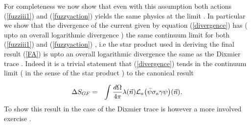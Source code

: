 \documentclass[a4paper,10pt]{article}
\begin{document}
For completeness we now show that even with this assumption both actions (\ref{fuzziii1}) and (\ref{fuzzyaction}) yields the same physics at the limit . In particular we show that the divergence of the current given by equation (\ref{divergence}) has ( upto an overall logarithmic divergence ) the same continuum limit for both (\ref{fuzziii1}) and (\ref{fuzzyaction}) , i.e the star product used in deriving the final result (\ref{FA}) is upto an overall logarithmic divergence the same as the Dixmier trace . Indeed it is a trivial statement that (\ref{divergence}) tends in the continuum limit ( in the sense of the star product ) to the canonical result

\begin{eqnarray}
{\Delta}S_{GF}&=&\int \frac{d{\Omega}}{4{\pi}}{\lambda}(\vec{n}){\cal L}_a\big(\bar{{\psi}}{\sigma}_a{\gamma}{{\psi}}\big)(\vec{n}).
\end{eqnarray}
To show this result in the case of the Dixmier trace is however a more involved exercise .
\end{document}
